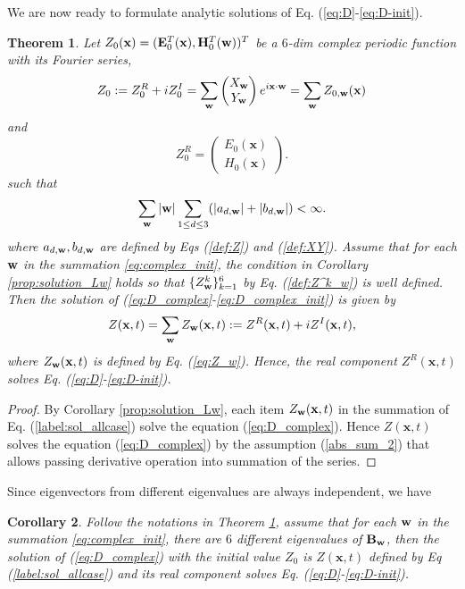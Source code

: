 \documentclass[10pt,reqno]{amsart}
\newcommand{\bB}{{\bf B}}
\renewcommand{\(}{\left(}
\renewcommand{\)}{\right)}
\newcommand{\bw}{{\bf w}}
\newcommand{\HH}{{\bf H}}
\newcommand{\EE}{{\bf E}}
\newcommand{\bx}{\mathbf{x}}
\newtheorem{theo}{Theorem}[section]
\newtheorem{cor}[theo]{Corollary}
\numberwithin{equation}{section}
\begin{document}
We are now ready to formulate analytic solutions of Eq. (\ref{eq:D}-\ref{eq:D-init}). 
\begin{theo}\label{thm-main}
Let $Z_0(\bx)=(\EE^T_0(\bx), \HH^T_0(\bw))^T$ be a $6$-dim complex periodic function with its Fourier series,
\begin{equation}\label{eq:complex_init}
	Z_0:=Z^R_0  + i Z^I_0= \sum_{\bw} \begin{pmatrix}
		X_{\bw}  \\
		Y_{\bw}
	\end{pmatrix} e^{i\bx \cdot \bw} = \sum_{\bw} Z_{0,\bw}(\bx)
\end{equation}
and
\begin{equation}\label{eq:real_init}
	Z^R_0 = \begin{pmatrix}
		E_0 (\bx)  \\
		H_0 (\bx)
	\end{pmatrix}.
\end{equation}
such that
	\begin{equation}\label{abs_sum_2}
		\sum_{\bw} |\bw| \sum_{1\le d\le 3} (|a_{d,\bw}| + |b_{d,\bw}| ) < \infty.
	\end{equation}
	where $a_{d,\bw},b_{d,\bw}$ are defined by Eqs (\ref{def:Z}) and (\ref{def:XY}).  Assume that for each $\bw$ in the summation \ref{eq:complex_init},  the condition in Corollary \ref{prop:solution_Lw} holds so that $\{Z^k_{\bw} \}_{k=1}^6$ by Eq. (\ref{def:Z^k_w}) is well defined. Then the solution of (\ref{eq:D_complex}-\ref{eq:D_complex_init}) is given by
	\begin{equation} \label{label:sol_allcase}
		Z(\bx, t) =  \sum_{\bw} Z_{\bw} (\bx, t) := Z^R(\bx, t) + iZ^I(\bx, t),
	\end{equation}
	where $Z_{\bw} (\bx, t)$ is  defined by Eq. (\ref{eq:Z_w}). Hence, the real component $Z^R(\bx, t)$ solves Eq. (\ref{eq:D}-\ref{eq:D-init}).
\end{theo}
\begin{proof}
	By Corollary \ref{prop:solution_Lw}, each item $Z_{\bw}(\bx, t)$ in the summation of Eq. (\ref{label:sol_allcase}) solve the equation (\ref{eq:D_complex}).  Hence $Z(\bx, t)$ solves the equation (\ref{eq:D_complex}) by the assumption (\ref{abs_sum_2}) that allows passing derivative operation into summation of the series.
\end{proof}
Since eigenvectors from different eigenvalues are always independent,  we have
\begin{cor}
Follow the notations in Theorem \ref{thm-main},  assume that for each $\bw$ in the summation \ref{eq:complex_init}, there are $6$ different eigenvalues of $\bB_{\bw}$,  then the solution of (\ref{eq:D_complex}) with the initial value $Z_0$ is $Z(\bx, t)$ defined by Eq (\ref{label:sol_allcase}) and its real component solves Eq. (\ref{eq:D}-\ref{eq:D-init}).
\end{cor}
\end{document}
